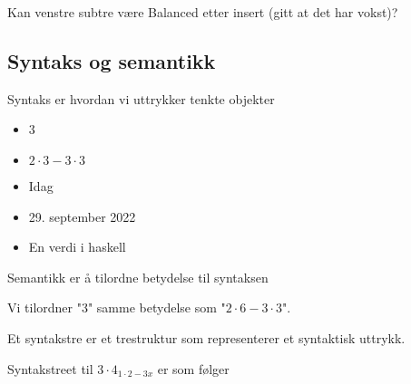 \documentclass{article}
\begin{document}
Kan venstre subtre være Balanced etter insert (gitt at det har vokst)?

\subsection{Syntaks og semantikk}
Syntaks er hvordan vi uttrykker tenkte objekter
\begin{itemize}
    \item 3
    \item \( 2 \cdot 3 - 3 \cdot  3 \)
    \item Idag
    \item 29. september 2022
    \item En verdi i haskell
\end{itemize}

Semantikk er å tilordne betydelse til syntaksen

\begin{eg}
    Vi tilordner "3" samme betydelse som "\( 2 \cdot 6 - 3 \cdot 3 \)".
\end{eg}

Et syntakstre er et trestruktur som representerer et syntaktisk uttrykk.

\begin{eg}
    Syntakstreet til \( 3 \cdot  4 _{ 1 \cdot  2 - 3x} \) er som følger

    \begin{figure}[H]
	\centering
\end{figure}
\end{eg}
\end{document}
